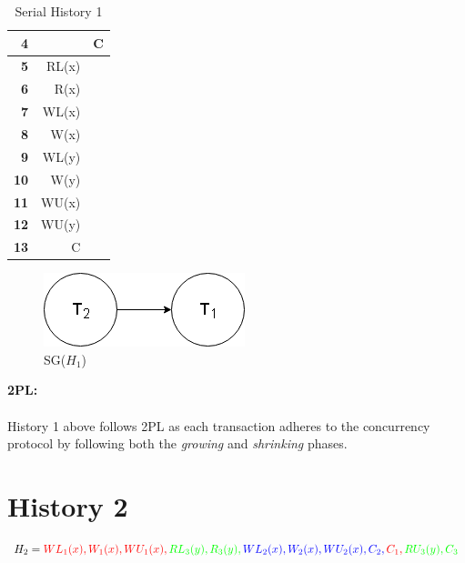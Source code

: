 \documentclass[12pt, letterpaper]{report}
\begin{document}
\begin{table}[H]
\begin{minipage}{0.48\textwidth}
\begin{tabular}{ |r|r|r| }
		\hline
		\textbf{4} & & C \\
		\hline
		\textbf{5} & RL(x) & \\
		\hline
		\textbf{6} & R(x) & \\
		\hline
		\textbf{7} & WL(x) & \\
		\hline
		\textbf{8} & W(x) & \\
		\hline
		\textbf{9} & WL(y) & \\
		\hline
		\textbf{10} & W(y) & \\
		\hline
		\textbf{11} & WU(x) & \\
		\hline
		\textbf{12} & WU(y) & \\
		\hline
		\textbf{13} & C & \\
		\hline
	\end{tabular}
	\caption{Serial History 1}
	\end{minipage}
\end{table}


\begin{figure}[H]
	\centering
	\includegraphics[width=0.5\columnwidth]{h1.png}
	\caption{SG($H_1$)}
\end{figure}


\textbf{2PL:}
\\ \\
History 1 above follows 2PL as each transaction adheres to the concurrency protocol by following both the \textit{growing} and \textit{shrinking} phases.

\pagebreak
\section{History 2}

\[ H_2 = \color{red} WL_1(x), W_1(x), WU_1(x), \color{green} RL_3(y), R_3(y), \color{blue} WL_2(x), W_2(x), WU_2(x), C_2, \color{red} C_1, \color{green} RU_3(y), C_3 \]
\end{document}
